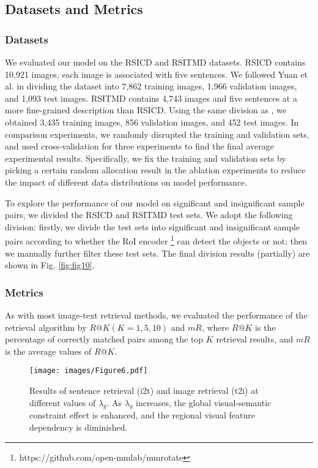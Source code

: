 \documentclass[journal]{IEEEtran}
\begin{document}
\subsection{Datasets and Metrics}
\subsubsection{Datasets}
We evaluated our model on the RSICD and RSITMD datasets. RSICD \cite{lu2017exploring} contains 10,921 images, each image is associated with five sentences. We followed Yuan et al. \cite{yuan2022exploring, yuan2022remote} in dividing the dataset into 7,862 training images, 1,966 validation images, and 1,093 test images. RSITMD \cite{yuan2022exploring} contains 4,743 images and five sentences at a more ﬁne-grained description than RSICD. Using the same division as \cite{yuan2022exploring, yuan2022remote}, we obtained 3,435 training images, 856 validation images, and 452 test images. In comparison experiments, we randomly disrupted the training and validation sets, and used cross-validation for three experiments to find the final average experimental results. Specifically, we fix the training and validation sets by picking a certain random allocation result in the ablation experiments to reduce the impact of different data distributions on model performance.

To explore the performance of our model on significant and insignificant sample pairs, we divided the RSICD and RSITMD test sets. We adopt the following division: firstly, we divide the test sets into significant and insignificant sample pairs according to whether the RoI encoder \footnote{https://github.com/open-mmlab/mmrotate} can detect the objects or not; then we manually further filter these test sets. The final division results (partially) are shown in Fig. \ref{fig:fig10}.
\subsubsection{Metrics}
As with most image-text retrieval methods, we evaluated the performance of the retrieval algorithm by $R@K (K=1, 5, 10)$ and $mR$, where $R@K$ is the percentage of correctly matched pairs among the top $K$ retrieval results, and $mR$ is the average values of $R@K$.

\begin{figure}[t]
  \centering
  \texttt{[image: images/Figure6.pdf]}
  \caption{Results of sentence retrieval (i2t) and image retrieval (t2i) at different values of $\lambda_g$. As $\lambda_g$ increases, the global visual-semantic constraint effect is enhanced, and the regional visual feature dependency is diminished.}
  \label{fig:fig5}
\end{figure}
\end{document}
